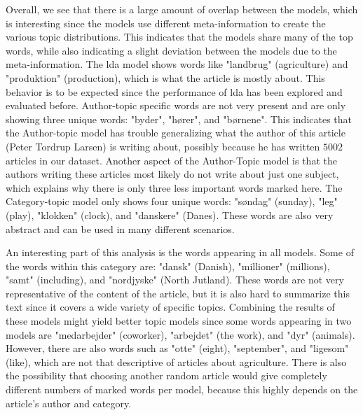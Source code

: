 {}

Overall, we see that there is a large amount of overlap between the models, which is interesting since the models use different meta-information to create the various topic distributions.
This indicates that the models share many of the top words, while also indicating a slight deviation between the models due to the meta-information.
The \gls{lda} model shows words like "landbrug" (agriculture) and "produktion" (production), which is what the article is mostly about.
This behavior is to be expected since the performance of \gls{lda} has been explored and evaluated before. 
Author-topic specific words are not very present and are only showing three unique words: "byder", "hører", and "børnene".
This indicates that the Author-topic model has trouble generalizing what the author of this article (Peter Tordrup Larsen) is writing about, possibly because he has written $5002$ articles in our dataset.
Another aspect of the Author-Topic model is that the authors writing these articles most likely do not write about just one subject, which explains why there is only three less important words marked here. 
The Category-topic model only shows four unique words: "søndag" (sunday), "leg" (play), "klokken" (clock), and "danskere" (Danes).
These words are also very abstract and can be used in many different scenarios.

An interesting part of this analysis is the words appearing in all models.
Some of the words within this category are: "dansk" (Danish), "millioner" (millions), "samt" (including), and "nordjyske" (North Jutland).
These words are not very representative of the content of the article, but it is also hard to summarize this text since it covers a wide variety of specific topics.
Combining the results of these models might yield better topic models since some words appearing in two models are "medarbejder" (coworker), "arbejdet" (the work), and "dyr" (animals).
However, there are also words such as "otte" (eight), "september", and "ligesom" (like), which are not that descriptive of articles about agriculture. 
There is also the possibility that choosing another random article would give completely different numbers of marked words per model, because this highly depends on the article's author and category.




